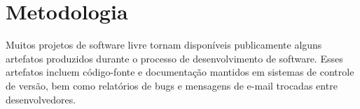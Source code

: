 \documentclass{article}
\begin{document}
%





\section{Metodologia}


Muitos projetos de software livre tornam disponíveis publicamente alguns
artefatos produzidos durante o processo de desenvolvimento de software. Esses
artefatos incluem código-fonte e documentação mantidos em sistemas de controle
de versão, bem como relatórios de bugs e mensagens de e-mail trocadas entre
desenvolvedores. 
\end{document}
